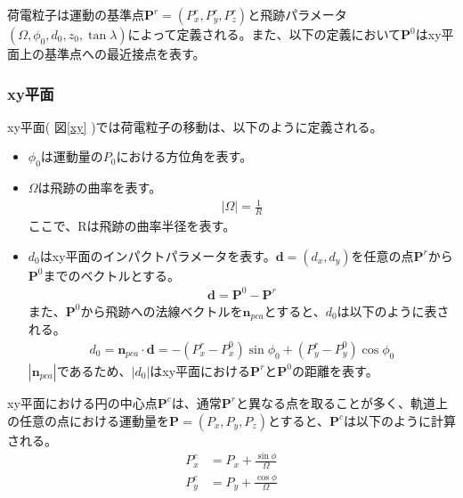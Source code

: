 荷電粒子は運動の基準点$\mathbf{P}^r = \left( P_x^r, P_y^r, P_z^r \right)$と飛跡パラメータ$\left( \Omega, {\phi}_0, d_0, z_0, \tan \lambda \right)$によって定義される。また、以下の定義において$\mathbf{P}^0$はxy平面上の基準点への最近接点を表す。
\subsubsection{xy平面}
xy平面( 図\ref{xy} )では荷電粒子の移動は、以下のように定義される。\cite{lcio}
\begin{itemize}
\item ${\phi}_0$は運動量の$P_0$における方位角を表す。\\
\item $\Omega$は飛跡の曲率を表す。\\
\begin{align}
|\Omega | = \frac{1}{R}
\end{align}
ここで、Rは飛跡の曲率半径を表す。\\
\item $d_0$はxy平面のインパクトパラメータを表す。$\mathbf{d} = (d_x, d_y)$を任意の点$\mathbf{P}^r$から$\mathbf{P}^0$までのベクトルとする。\\
\begin{align}
\mathbf{d} = \mathbf{P}^0 - \mathbf{P}^r
\end{align}
また、$\mathbf{P}^0$から飛跡への法線ベクトルを$\mathbf{n}_{pca}$とすると、$d_0$は以下のように表される。
\begin{align}
d_0 = \mathbf{n}_{pca} \cdot \mathbf{d} = - ( P_x^r - P_x^0 ) \sin {\phi}_0 +  ( P_y^r - P_y^0 ) \cos {\phi}_0
\end{align}
$|\mathbf{n}_{pca}|$であるため、$|d_0|$はxy平面における$\mathbf{P}^r$と$\mathbf{P}^0$の距離を表す。
\end{itemize}
xy平面における円の中心点$\mathbf{P}^c$は、通常$\mathbf{P}^r$と異なる点を取ることが多く、軌道上の任意の点における運動量を$\mathbf{P} = \left( P_x, P_y, P_z \right)$とすると、$\mathbf{P}^c$は以下のように計算される。
\begin{align}
P_x^c &= P_x + \frac{\sin \phi}{\Omega}\\
P_y^c &= P_y + \frac{\cos \phi}{\Omega}\\
\end{align}
